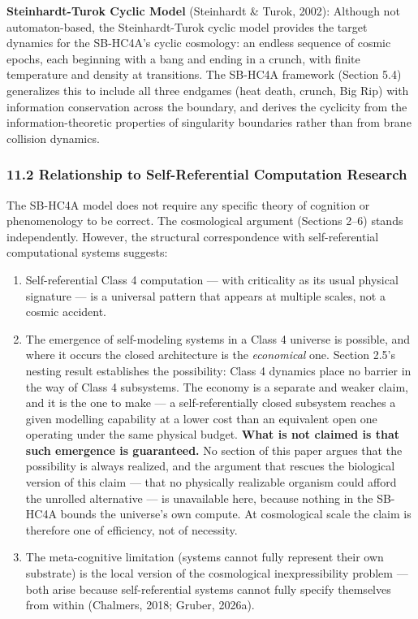 \documentclass[
]{article}
\providecommand{\tightlist}{%
  \setlength{\itemsep}{0pt}\setlength{\parskip}{0pt}}
\begin{document}
\textbf{Steinhardt-Turok Cyclic Model} (Steinhardt \& Turok, 2002):
Although not automaton-based, the Steinhardt-Turok cyclic model provides
the target dynamics for the SB-HC4A's cyclic cosmology: an endless
sequence of cosmic epochs, each beginning with a bang and ending in a
crunch, with finite temperature and density at transitions. The SB-HC4A
framework (Section 5.4) generalizes this to include all three endgames
(heat death, crunch, Big Rip) with information conservation across the
boundary, and derives the cyclicity from the information-theoretic
properties of singularity boundaries rather than from brane collision
dynamics.

\hypertarget{relationship-to-self-referential-computation-research}{%
\subsubsection{11.2 Relationship to Self-Referential Computation
Research}\label{relationship-to-self-referential-computation-research}}

The SB-HC4A model does not require any specific theory of cognition or
phenomenology to be correct. The cosmological argument (Sections 2--6)
stands independently. However, the structural correspondence with
self-referential computational systems suggests:

\begin{enumerate}
\def\labelenumi{\arabic{enumi}.}
\tightlist
\item
  Self-referential Class 4 computation --- with criticality as its usual
  physical signature --- is a universal pattern that appears at multiple
  scales, not a cosmic accident.
\item
  The emergence of self-modeling systems in a Class 4 universe is
  possible, and where it occurs the closed architecture is the
  \emph{economical} one. Section 2.5's nesting result establishes the
  possibility: Class 4 dynamics place no barrier in the way of Class 4
  subsystems. The economy is a separate and weaker claim, and it is the
  one to make --- a self-referentially closed subsystem reaches a given
  modelling capability at a lower cost than an equivalent open one
  operating under the same physical budget. \textbf{What is not claimed
  is that such emergence is guaranteed.} No section of this paper argues
  that the possibility is always realized, and the argument that rescues
  the biological version of this claim --- that no physically realizable
  organism could afford the unrolled alternative --- is unavailable
  here, because nothing in the SB-HC4A bounds the universe's own
  compute. At cosmological scale the claim is therefore one of
  efficiency, not of necessity.
\item
  The meta-cognitive limitation (systems cannot fully represent their
  own substrate) is the local version of the cosmological
  inexpressibility problem --- both arise because self-referential
  systems cannot fully specify themselves from within (Chalmers, 2018;
  Gruber, 2026a).
\end{enumerate}
\end{document}
